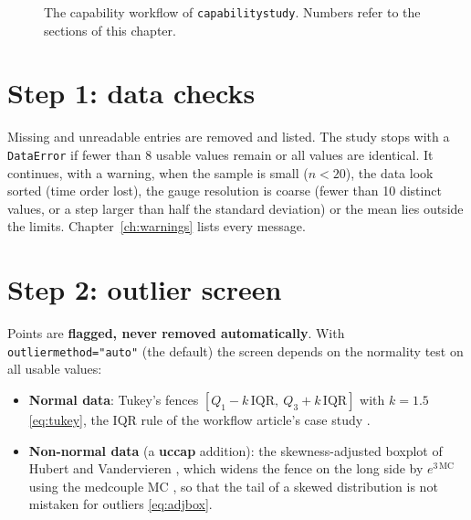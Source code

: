 \documentclass[a4paper,11pt,oneside,openany,parskip=half-,headings=standardclasses,toc=flat,numbers=noenddot]{scrbook}
\newcommand{\code}[1]{\texttt{\begingroup\def\_{\textunderscore\allowbreak}#1\endgroup}}
\newcommand{\pkg}{\textsf{\bfseries uccap}}
\newcommand{\chapref}[1]{Chapter~\ref{#1}}
\begin{document}
\begin{figure}[!htp]
\caption{The capability workflow of \code{capability\_study}. Numbers refer to the sections of this
chapter.}\label{fig:workflow}
\end{figure}

\section{Step 1: data checks}
Missing and unreadable entries are removed and listed. The study stops with a \code{DataError} if
fewer than 8 usable values remain or all values are identical. It continues, with a warning, when the
sample is small ($n < 20$), the data look sorted (time order lost), the gauge resolution is coarse
(fewer than 10 distinct values, or a step larger than half the standard deviation) or the mean lies
outside the limits. \chapref{ch:warnings} lists every message.

\section{Step 2: outlier screen}\label{sec:outliers}
Points are \textbf{flagged, never removed automatically}. With \code{outlier\_method="auto"} (the
default) the screen depends on the normality test on all usable values:

\begin{itemize}
\item \textbf{Normal data}: Tukey's fences \cite{tukey} $[Q_1 - k\,\mathrm{IQR},\ Q_3 + k\,\mathrm{IQR}]$ with $k = 1.5$
  \eqref{eq:tukey}, the IQR rule of the workflow article's case study \cite[Sec.~6.1.1]{jy-workflow}.
\item \textbf{Non-normal data} (a \pkg{} addition): the skewness-adjusted boxplot of Hubert and Vandervieren \cite{hubert}, which
  widens the fence on the long side by $e^{3\,\mathrm{MC}}$ using the medcouple MC \cite{brys}, so that the tail
  of a skewed distribution is not mistaken for outliers \eqref{eq:adjbox}.
\end{itemize}
\end{document}
